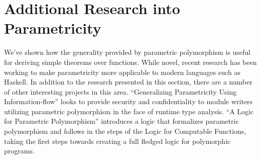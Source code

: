 \section{Additional Research into Parametricity}
We've shown how the generality provided by parametric polymorphism is useful for deriving simple theorems over functions. While novel, recent research has been working to make parametricity more applicable to modern languages such as Haskell. In addition to the research presented in this section, there are a number of other interesting projects in this area. ``Generalizing Parametricity Using Information-flow'' \cite{infoFlow} looks to provide security and confidentiality to module writers utilizing parametric polymorphism in the face of runtime type analysis. ``A Logic for Parametric Polymorphism'' \cite{paraLogic} introduces a logic that formalizes parametric polymorphism and follows in the steps of the Logic for Computable Functions, taking the first steps towards creating a full fledged logic for polymorphic programs.

